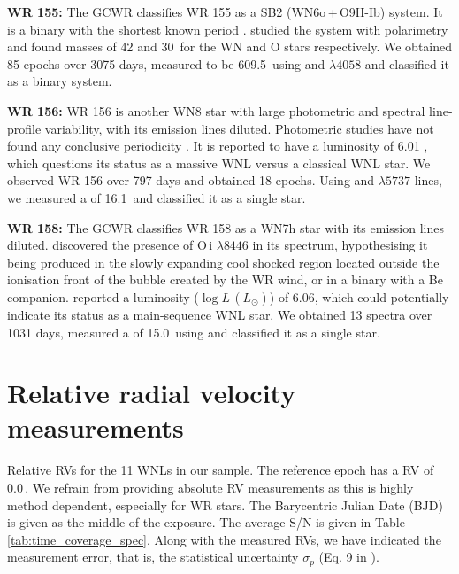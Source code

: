 \textbf{WR 155:} The GCWR classifies WR 155 as a SB2 (WN6o\,+\,O9II-Ib) system. It is a binary with the shortest known period \citep[1.6412436\,d,][]{moffat_photometric_1986,marchenko_wind-wind_1995}. \citet{drissen_polarimetic_1986} studied the system with polarimetry and found masses of 42 and 30\,\Msun{} for the WN and O stars respectively. We obtained 85 epochs over 3075 days, measured \DelRV{} to be 609.5\,\kms{} using \NVred{} and $\lambda 4058$ and classified it as a binary system. 

\textbf{WR 156:} WR 156 is another WN8 star with large photometric and spectral line-profile variability, with its emission lines diluted. Photometric studies have not found any conclusive periodicity \citep{moffat_photometric_1986,marchenko_wolf-rayet_1998}. It is reported to have a luminosity of 6.01 \citep{hamann_galactic_2019}, which questions its status as a massive WNL versus a classical WNL star. We observed WR 156 over 797 days and obtained 18 epochs. Using \NIVred{} and $\lambda 5737$ lines, we measured a \DelRV{} of 16.1\,\kms{} and classified it as a single star.

\textbf{WR 158:} The GCWR classifies WR 158 as a WN7h star with its emission lines diluted. \citet{andrillat_surprising_1992} discovered the presence of O\,{\sc i} $\lambda 8446$ in its spectrum, hypothesising it being produced in the slowly expanding cool shocked region located outside the ionisation front of the bubble created by the WR wind, or in a binary with a Be companion. \citet{hamann_galactic_2019} reported a luminosity ($\log L$\,$(L_\odot)$) of 6.06, which could potentially indicate its status as a main-sequence WNL star. We obtained 13 spectra over 1031 days, measured a \DelRV{} of 15.0\,\kms{} using \NIVred{} and classified it as a single star.

\section{Relative radial velocity measurements}\label{apdx:rv_measurements}

Relative RVs for the 11 WNLs in our sample. The reference epoch has a RV of 0.0\,\kms{}. We refrain from providing absolute RV measurements as this is highly method dependent, especially for WR stars. The Barycentric Julian Date (BJD) is given as the middle of the exposure. The average S/N is given in Table\,\ref{tab:time_coverage_spec}. Along with the measured RVs, we have indicated the measurement error, that is, the statistical uncertainty $\sigma_p$ (Eq. 9 in ). 

